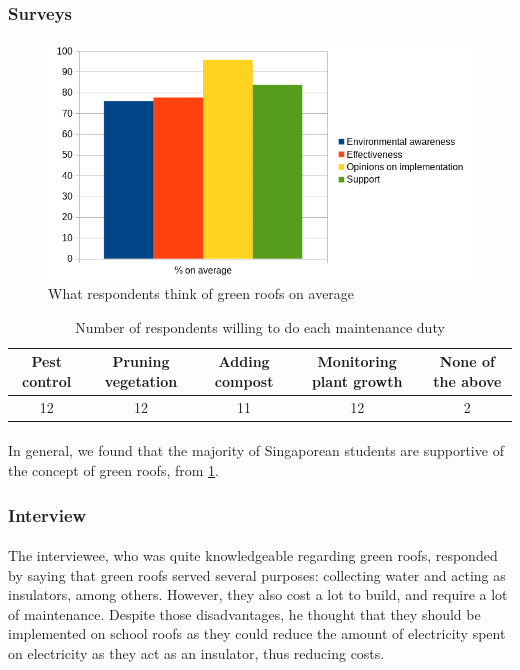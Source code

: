 \documentclass[a4paper]{article}
\begin{document}
\begin{multicols}{2}
  \subsubsection{Surveys}
  \begin{figure}[H]
    \centering
    \includegraphics[width=\linewidth]{responses-ave.png}
    \caption{What respondents think of green roofs on average}
    \label{fig:surv-resp}
  \end{figure}

  \begin{table}
    \centering
    \caption{Number of respondents willing to do each maintenance duty}
    \begin{tabular}{|c|c|c|c|c|}
      \hline
      \rowcolor{cyan}
      Pest control & Pruning vegetation  & Adding compost &
      Monitoring plant growth & None of the above \\ \hline
      12 & 12 & 11 & 12 & 2 \\ \hline
    \end{tabular}
    \label{tab:duties}
  \end{table}

  \paragraph{} \label{par:support} In general, we found that the
  majority of Singaporean students are supportive of the concept of
  green roofs, from \cref{fig:surv-resp}.

  \subsubsection{Interview}
  \paragraph{} The interviewee, who was quite knowledgeable
  regarding green roofs, responded by saying that green roofs served
  several purposes: collecting water and acting as insulators, among
  others. However, they also cost a lot to build, and require a lot of
  maintenance. Despite those disadvantages, he thought that they should
  be implemented on school roofs as they could reduce the amount of
  electricity spent on electricity as they act as an insulator, thus
  reducing costs.




\end{multicols}
\end{document}
